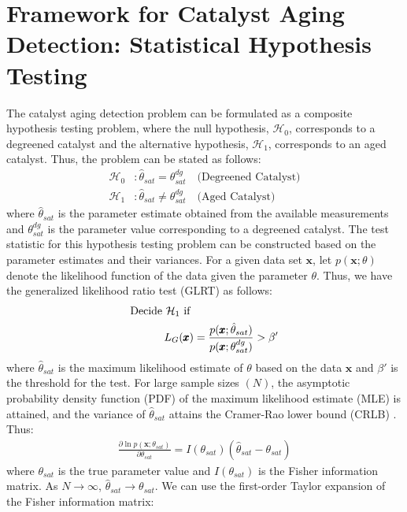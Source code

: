 \section{Framework for Catalyst Aging Detection: Statistical Hypothesis Testing}
The catalyst aging detection problem can be formulated as a composite hypothesis testing problem, where the null
hypothesis, $\mathcal{H}_0$, corresponds to a degreened catalyst and the alternative hypothesis, $\mathcal{H}_1$,
corresponds to an aged catalyst. Thus, the problem can be stated as follows:
\begin{align}
        \mathcal{H}_0 &: \hat \theta_{sat} = \theta^{dg}_{sat} \quad \text{(Degreened Catalyst)} \\
        \mathcal{H}_1 &: \hat \theta_{sat} \neq \theta^{dg}_{sat} \quad \text{(Aged Catalyst)}
\end{align}
where $\hat \theta_{sat}$ is the parameter estimate obtained from the available measurements and $\theta^{dg}_{sat}$ is the parameter value corresponding to a degreened catalyst. The test statistic for this hypothesis testing problem can be constructed based on the parameter estimates and their variances. For a given data set $\pmb x$, let $p(\pmb x; \theta)$ denote the likelihood function of the data given the parameter $\theta$. Thus, we have the generalized likelihood ratio test (GLRT) \cite{kay1998detection} as follows:
\begin{align}
\text{Decide } \mathcal{H}_1 \text{ if } & \notag \\
        L_G (\pmb x) &= \frac{p(\pmb x; \hat \theta_{sat})}{p(\pmb x; \theta^{dg}_{sat})} > \beta'
\end{align}
where $\hat \theta_{sat}$ is the maximum likelihood estimate of $\theta$ based on the data $\pmb x$ and $\beta'$ is the
threshold for the test. For large sample sizes $(N)$, the asymptotic probability density function (PDF) of the maximum likelihood estimate (MLE) is attained, and the variance of $\hat \theta_{sat}$ attains the Cramer-Rao lower bound (CRLB) \cite{kay1993estimation}. Thus:
\begin{align}
        \frac{\partial \ln p(\pmb x; \theta_{sat})}{\partial \theta_{sat}} = I(\theta_{sat})(\hat \theta_{sat} - \theta_{sat})
        \label{eqn::log_ln_P}
\end{align}
where $\theta_{sat}$ is the true parameter value and $I(\theta_{sat})$ is the Fisher information matrix. As $N \rightarrow \infty$, $\hat \theta_{sat} \rightarrow \theta_{sat}$. We can use the first-order Taylor expansion of the Fisher information matrix:
